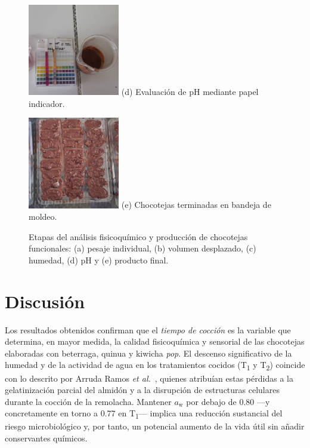 \documentclass[manuscript,screen,review]{acmart}
\begin{document}
\begin{figure}[H]
\begin{minipage}{0.26\linewidth}
    \includegraphics[width=4cm,height=4cm,keepaspectratio]{imagen/resultados/pH-re.jpeg}
    \small (d) Evaluación de pH mediante papel indicador.
  \end{minipage}\hfill
  \begin{minipage}{0.26\linewidth}
    \centering
    \includegraphics[width=4cm,height=4cm,keepaspectratio]{imagen/resultados/Choco-re.jpeg}
    \small (e) Chocotejas terminadas en bandeja de moldeo.
  \end{minipage}
  \caption{Etapas del análisis fisicoquímico y producción de chocotejas funcionales: (a) pesaje individual, (b) volumen desplazado, (c) humedad, (d) pH y (e) producto final.}
  \label{fig:proceso_analisis}
\end{figure}






\section{Discusión}

Los resultados obtenidos confirman que el \emph{tiempo de cocción} es la variable que determina, en mayor medida, la calidad fisicoquímica y sensorial de las chocotejas elaboradas con beterraga, quinua y kiwicha \textit{pop}. El descenso significativo de la humedad y de la actividad de agua en los tratamientos cocidos (T\textsubscript{1} y T\textsubscript{2}) coincide con lo descrito por Arruda Ramos \textit{et al.}~\citep{ArrudaRamos2017}, quienes atribuían estas pérdidas a la gelatinización parcial del almidón y a la disrupción de estructuras celulares durante la cocción de la remolacha. Mantener $a_\mathrm{w}$ por debajo de 0.80 —y concretamente en torno a 0.77 en T\textsubscript{1}— implica una reducción sustancial del riesgo microbiológico y, por tanto, un potencial aumento de la vida útil sin añadir conservantes químicos.
\end{document}
